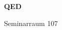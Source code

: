 \documentclass[a4paper]{article}
\begin{document}
\printGenericVSLHeader
\begin{center}
\begin{vsltext}{3cm}{4cm}

   \vspace{0.5cm} 

    \textbf{QED} 

    \vspace{1.5cm}

    Seminarraum 107

\end{vsltext}

\end{center}
\end{document}
